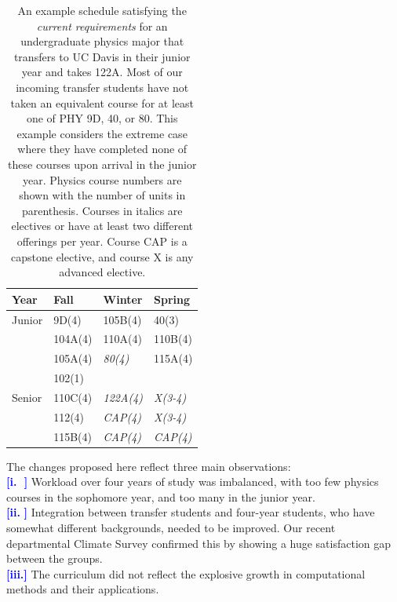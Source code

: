 \documentclass[12pt]{article}
\newcommand{\tcb}{\textcolor{blue}}
\begin{document}
\begin{table}[thbp]
\caption{\label{tbl:current-transfers} An example schedule
  satisfying the {\em current requirements} for an undergraduate
  physics major that transfers to UC Davis in their junior year and
  takes 122A.  Most of our incoming transfer students have not taken
  an equivalent course for at least one of PHY 9D, 40, or 80.  This
  example considers the extreme case where they have completed none of
  these courses upon arrival in the junior year.  Physics course
  numbers are shown with the number of units in parenthesis.  Courses
  in italics are electives or have at least two different offerings
  per year.  Course CAP is a capstone elective, and course X is any
  advanced elective.}
\begin{center}
\begin{tabular}{|l|l|l|l|}
\hline
Year      & Fall    & Winter & Spring \\
\hline
Junior    & 9D(4)   & 105B(4) & 40(3)   \\
          & 104A(4) & 110A(4) & 110B(4) \\
          & 105A(4) & {\it 80(4)}   & 115A(4) \\
          & 102(1)  &         & \\
\hline
Senior    & 110C(4) & {\it 122A(4)} & {\it X(3-4)}\\
          & 112(4)  & {\it CAP(4)}   & {\it X(3-4)}\\
          & 115B(4) & {\it CAP(4)}   & {\it CAP(4)}\\
\hline 
\end{tabular}
\end{center}
\end{table}




The changes proposed here reflect three main observations: \\
\tcb{\bf [i.\,\,\,\,]}  Workload over four years of study was imbalanced, with too few physics
courses in the sophomore year, and too many in the junior year. \\
\tcb{\bf [ii.\,\,]}  
Integration between transfer students and
four-year students, who have somewhat different backgrounds, needed to be
improved. Our recent departmental Climate Survey confirmed this by showing a
huge satisfaction gap between the groups. \\
\tcb{\bf [iii.]}  The curriculum did not reflect the explosive growth
in computational methods and their applications.
\end{document}
